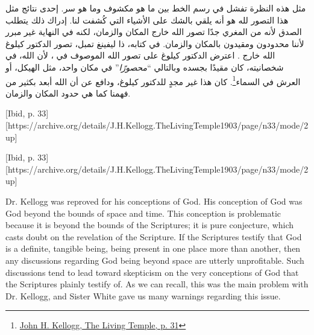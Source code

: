 مثل هذه النظرة تفشل في رسم الخط بين ما هو مكشوف وما هو سر. إحدى نتائج مثل هذا التصور لله هو أنه يلقي بالشك على الأشياء التي كُشفت لنا. إدراك ذلك يتطلب الصدق لأنه من المغري جدًا تصور الله خارج المكان والزمان، لكنه في النهاية غير مبرر لأننا محدودون ومقيدون بالمكان والزمان. في كتابه، ذا ليفينغ تمبل، تصور الدكتور كيلوغ الله خارج . اعترض الدكتور كيلوغ على تصور الله الموصوف في ، لأن الله، في شخصانيته، كان مقيدًا بجسده وبالتالي “\textit{محصورًا}” في مكان واحد، مثل الهيكل، أو العرش في السماء\footnote{\href{https://archive.org/details/J.H.Kellogg.TheLivingTemple1903/page/n31/mode/2up}{John H. Kellogg, The Living Temple, p. 31}}. كان هذا غير مجدٍ للدكتور كيلوغ، ودافع عن أن الله أبعد بكثير من فهمنا كما هي حدود المكان والزمان.


[Ibid, p. 33][https://archive.org/details/J.H.Kellogg.TheLivingTemple1903/page/n33/mode/2up]


[Ibid, p. 33][https://archive.org/details/J.H.Kellogg.TheLivingTemple1903/page/n33/mode/2up]


Dr. Kellogg was reproved for his conceptions of God. His conception of God was God beyond the bounds of space and time. This conception is problematic because it is beyond the bounds of the Scriptures; it is pure conjecture, which casts doubt on the revelation of the Scripture. If the Scriptures testify that God is a definite, tangible being, being present in one place more than another, then any discussions regarding God being beyond space are utterly unprofitable. Such discussions tend to lead toward skepticism on the very conceptions of God that the Scriptures plainly testify of. As we can recall, this was the main problem with Dr. Kellogg, and Sister White gave us many warnings regarding this issue.


